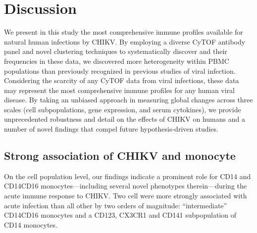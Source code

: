 \section{Discussion}

We present in this study the most comprehensive immune profiles available for natural human infections by CHIKV. By employing a diverse CyTOF antibody panel and novel clustering techniques to systematically discover \subcommunities{} and their frequencies in these data, we discovered more heterogeneity within PBMC populations than previously recognized in previous studies of viral infection. Considering the scarcity of any CyTOF data from viral infections,\autocite{Miner2015,Sen2015} these data may represent the most comprehensive immune profiles for any human viral disease. By taking an unbiased approach in measuring global changes across three scales (cell subpopulations, gene expression, and serum cytokines), we provide unprecedented robustness and detail on the effects of CHIKV on humans and a number of novel findings that compel future hypothesis-driven studies.

\subsection{Strong association of CHIKV and monocyte \subcommunities{}}

On the cell population level, our findings indicate a prominent role for CD14\sups{+} and CD14\sups{+}\allowbreak CD16\sups{+} monocytes—including several novel phenotypes therein—during the acute immune response to CHIKV. Two cell \subcommunities{} were more strongly associated with acute infection than all other \subcommunities{} by two orders of magnitude: “intermediate” CD14\sups{++}\allowbreak CD16\sups{+} monocytes and a CD123\sups{+}, CX3CR1\sups{+} and CD141\sups{+} subpopulation of CD14\sups{+} monocytes.	

